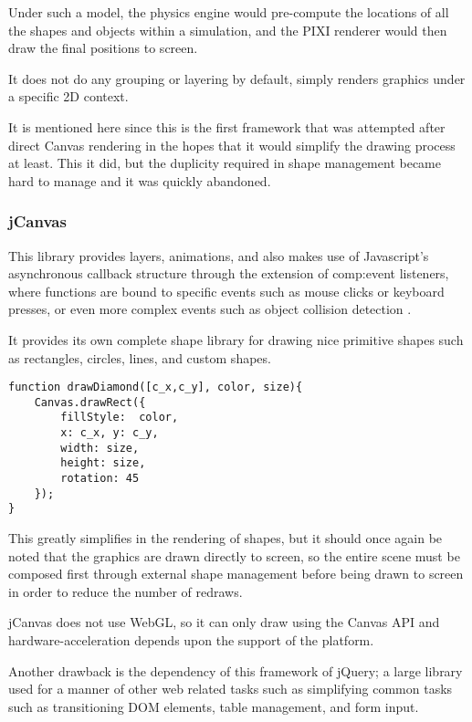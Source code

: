 Under such a model, the physics engine would pre-compute the locations of all the shapes and objects within a simulation, and the PIXI renderer would then draw the final positions to screen. 

It does not do any grouping or layering  by default, simply renders graphics under a specific 2D context. 

It is mentioned here since this is the first framework that was attempted after direct Canvas rendering in the hopes that it would simplify the drawing process at least. This it did, but the duplicity required in shape management became hard to manage and it was quickly abandoned.


\subsubsection{jCanvas}

This library provides layers, animations, and also makes use of Javascript's asynchronous callback structure through the extension of \gls{comp:event listeners}, where functions are bound to specific events such as mouse clicks or keyboard presses, or even more complex events such as object collision detection \cite{jcanvas}.

It provides its own complete shape library for drawing nice primitive shapes such as rectangles, circles, lines, and custom shapes.


\begingroup
\begin{spacing}{1}
\begin{lstlisting}[label=code:jCanvasapi]
function drawDiamond([c_x,c_y], color, size){
	Canvas.drawRect({
		fillStyle:  color,
		x: c_x,	y: c_y,
		width: size,
		height: size,
		rotation: 45
	});
}
\end{lstlisting}
\vspace{-10pt}
\end{spacing}
\endgroup

This greatly simplifies in the rendering of shapes, but it should once again be noted that the graphics are drawn directly to screen, so the entire scene must be composed first through external shape management before being drawn to screen in order to reduce the number of redraws.

jCanvas does not use WebGL, so it can only draw using the Canvas API and hardware-acceleration depends upon the support of the platform.

Another drawback is the dependency of this framework of jQuery; a large library used for a manner of other web related tasks such as simplifying common tasks such as transitioning DOM elements, table management, and form input.


